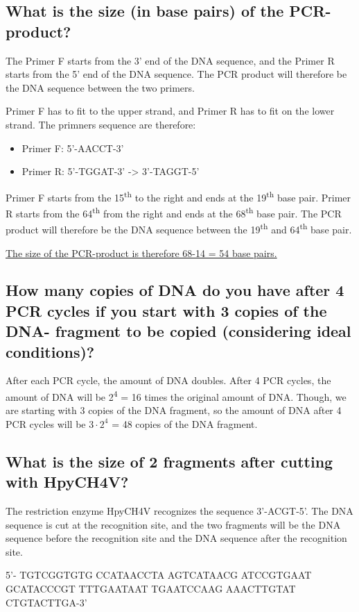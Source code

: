 \subsection{What is the size (in base pairs) of the PCR-product?}
The Primer F starts from the 3' end of the DNA sequence, and the Primer R starts from the 5' end of the DNA sequence. The PCR product will therefore be the DNA sequence between the two primers.

Primer F has to fit to the upper strand, and Primer R has to fit on the lower strand. The primners sequence are therefore:
\begin{itemize}
    \item Primer F: 5'-AACCT-3' 
    \item Primer R: 5'-TGGAT-3' -> 3'-TAGGT-5'
\end{itemize}

Primer F starts from the 15\textsuperscript{th} to the right and ends at the 19\textsuperscript{th} base pair. Primer R starts from the 64\textsuperscript{th} from the right and ends at the 68\textsuperscript{th} base pair. The PCR product will therefore be the DNA sequence between the 19\textsuperscript{th} and 64\textsuperscript{th} base pair.

\underline{The size of the PCR-product is therefore 68-14 = 54 base pairs.}

\subsection{How many copies of DNA do you have after 4 PCR cycles if you start with 3 copies of the DNA- fragment to be copied (considering ideal conditions)?}
After each PCR cycle, the amount of DNA doubles. After 4 PCR cycles, the amount of DNA will be 2\textsuperscript{4} = 16 times the original amount of DNA.
Though, we are starting with 3 copies of the DNA fragment, so the amount of DNA after 4 PCR cycles will be $3 \cdot 2^4$ = 48 copies of the DNA fragment.

\subsection{What is the size of 2 fragments after cutting with HpyCH4V?}
The restriction enzyme HpyCH4V recognizes the sequence 3'-ACGT-5'. The DNA sequence is cut at the recognition site, and the two fragments will be the DNA sequence before the recognition site and the DNA sequence after the recognition site.

5'- TGTCGGTGTG CCATAACCTA AGTCATAACG ATCCGTGAAT GCATACCCGT TTTGAATAAT TGAATCCAAG AAACTTGTAT CTGTACTTGA-3'

